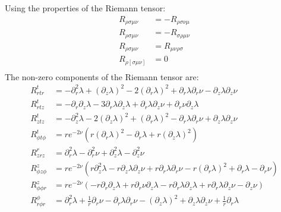 \documentclass{article}
\begin{document}
Using the properties of the Riemann tensor:
\begin{equation}
\begin{aligned}
R_{\rho\sigma\mu\nu}&=-R_{\rho\sigma\nu\mu}\\
R_{\rho\sigma\mu\nu}&=-R_{\sigma\rho\mu\nu}\\
R_{\rho\sigma\mu\nu}&=R_{\mu\nu\rho\sigma}\\
R_{\rho[\sigma\mu\nu]}&=0\\
\end{aligned}
\end{equation}
The non-zero components of the Riemann tensor are:
\begin{equation}
\begin{aligned}
R^{t}_{rtr}&=-\partial^{2}_{r}\lambda+\left(\partial_{z}\lambda\right)^{2}-2\left(\partial_{r}\lambda\right)^{2}+\partial_{r}\lambda\partial_{r}\nu-\partial_{z}\lambda\partial_{z}\nu\\
R^{t}_{rtz}&=-\partial_{r}\partial_{z}\lambda-3\partial_{r}\lambda\partial_{z}\lambda+\partial_{r}\lambda\partial_{z}\nu+\partial_{r}\nu\partial_{z}\lambda\\
R^{t}_{ztz}&=-\partial^{2}_{z}\lambda-2\left(\partial_{z}\lambda\right)^{2}+\left(\partial_{r}\lambda\right)^{2}-\partial_{r}\lambda\partial_{r}\nu+\partial_{z}\lambda\partial_{z}\nu\\
R^{t}_{\phi t\phi}&=re^{-2\nu}\left(r\left(\partial_{r}\lambda\right)^{2}-\partial_{r}\lambda+r\left(\partial_{z}\lambda\right)^{2}\right)\\
R^{r}_{zrz}&=\partial^{2}_{r}\lambda-\partial^{2}_{r}\nu+\partial^{2}_{z}\lambda-\partial^{2}_{z}\nu\\
R^{z}_{\phi z\phi}&=re^{-2\nu}\left(r\partial^{2}_{z}\lambda-r\partial_{z}\lambda\partial_{z}\nu+r\partial_{r}\lambda\partial_{r}\nu-r\left(\partial_{r}\lambda\right)^{2}+\partial_{r}\lambda-\partial_{r}\nu\right)\\
R^{z}_{\phi\phi r}&=re^{-2\nu}\left(-r\partial_{r}\partial_{z}\lambda+r\partial_{r}\nu\partial_{z}\lambda-r\partial_{r}\lambda\partial_{z}\lambda+r\partial_{r}\lambda\partial_{z}\nu-\partial_{z}\nu\right)\\
R^{\phi}_{r\phi r}&=\partial^{2}_{r}\lambda+\frac{1}{r}\partial_{r}\nu-\partial_{r}\lambda\partial_{r}\nu-\left(\partial_{z}\lambda\right)^{2}+\partial_{z}\lambda\partial_{z}\nu+\frac{1}{r}\partial_{r}\lambda\\
\end{aligned}
\end{equation}
\end{document}
